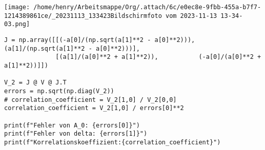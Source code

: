 \documentclass[11pt]{article}
\begin{document}
\begin{center}
\texttt{[image: /home/henry/Arbeitsmappe/Org/.attach/6c/e0ec8e-9fbb-455a-b7f7-1214389861ce/\_20231113\_133423Bildschirmfoto vom 2023-11-13 13-34-03.png]}
\end{center}

\begin{verbatim}
J = np.array([[(-a[0]/(np.sqrt(a[1]**2 - a[0]**2))), (a[1]/(np.sqrt(a[1]**2 - a[0]**2)))],
              [(a[1]/(a[0]**2 + a[1]**2)),           (-a[0]/(a[0]**2 + a[1]**2))]])

V_2 = J @ V @ J.T
errors = np.sqrt(np.diag(V_2))
# correlation_coefficient = V_2[1,0] / V_2[0,0]
correlation_coefficient = V_2[1,0] / errors[0]**2

print(f"Fehler von A_0: {errors[0]}")
print(f"Fehler von delta: {errors[1]}")
print(f"Korrelationskoeffizient:{correlation_coefficient}")
\end{verbatim}
\end{document}
